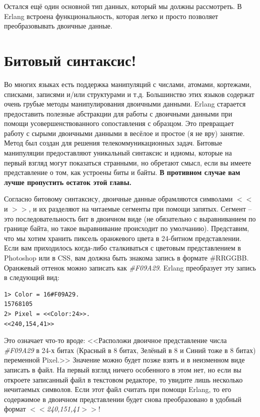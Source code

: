 \documentclass[a4paper,12pt]{report}
\begin{document}
Остался ещё один основной тип данных, который мы должны рассмотреть. В Erlang встроена функциональность, которая легко и просто позволяет преобразовывать двоичные данные.
\section{Битовый синтаксис!}
Во многих языках есть поддержка манипуляций с числами, атомами, кортежами, списками, записями и/или структурами и т.д. Большинство этих языков содержат очень грубые методы манипулирования двоичными данными. Erlang старается предоставить полезные абстракции для работы с двоичными данными при помощи усовершенствованного сопоставления с образцом. Это превращает работу с сырыми двоичными данными в весёлое и простое (я не вру) занятие. Метод был создан для решения телекоммуникационных задач. Битовые манипуляции предоставляют уникальный синтаксис и идиомы, которые на первый взгляд могут показаться странными, но обретают смысл, если вы имеете представление о том, как устроены биты и байты. \textbf{В противном случае вам лучше пропустить остаток этой главы.}

Согласно битовому синтаксису, двоичные данные обрамляются символами $<<$ и $>>$, и их разделяют на читаемые сегменты при помощи запятых. Сегмент \--- это последовательность бит в двоичном виде (не обязательно с выравниванием по границе байта, но такое выравнивание происходит по умолчанию). Представим, что мы хотим хранить пиксель оранжевого цвета в 24\--битном представлении. Если вам приходилось когда\--либо сталкиваться с цветовым представлением в Photoshop или в CSS, вам должна быть знакома запись в формате \#RRGGBB. Оранжевый оттенок можно записать как \emph{\#F09A29}. Erlang преобразует эту запись в следующий вид:
\begin{lstlisting}[style=repl]
1> Color = 16#F09A29.
15768105
2> Pixel = <<Color:24>>.
<<240,154,41>>
\end{lstlisting}

Это означает что\--то вроде: <<Расположи двоичное представление числа \emph{\#F09A29} в 24\--х битах (Красный в 8 битах, Зелёный в 8 и Синий тоже в 8 битах) переменной Pixel.>> Значение можно будет позже взять и в неизменном виде записать в файл. На первый взгляд ничего особенного в этом нет, но если вы откроете записанный файл в текстовом редакторе, то увидите лишь несколько нечитаемых символов. Если этот файл считать при помощи Erlang, то его содержимое в двоичном представлении будет снова преобразовано в удобный формат \emph{$<<$240,151,41$>>$}!
\end{document}
